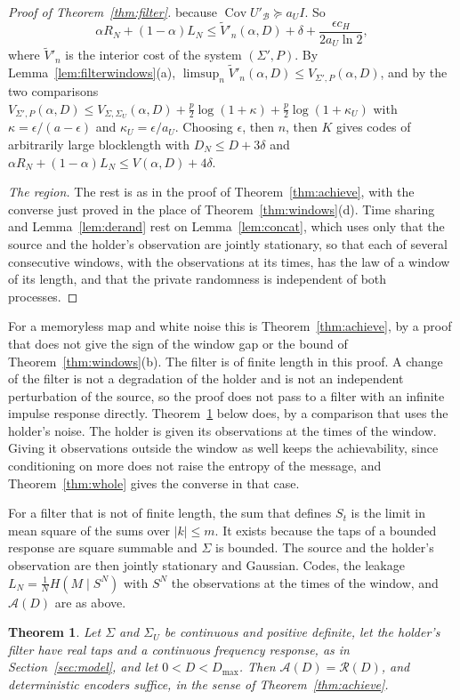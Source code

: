 \documentclass[11pt,onecolumn]{IEEEtran}
\newtheorem{theorem}{Theorem}
\newcommand{\Cov}{\operatorname{Cov}}
\begin{document}
\begin{proof}[Proof of Theorem~\ref{thm:filter}]
because $\Cov U'_{\mathcal B}\succeq a_UI$. So
\[
\alpha R_N+(1-\alpha)L_N\le\tilde V'_n(\alpha,D)+\delta+\frac{\epsilon c_H}{2a_U\ln2},
\]
where $\tilde V'_n$ is the interior cost of the system $(\Sigma',P)$. By
Lemma~\ref{lem:filterwindows}(a), $\limsup_n\tilde V'_n(\alpha,D)\le V_{\Sigma',P}(\alpha,D)$,
and by the two comparisons
$V_{\Sigma',P}(\alpha,D)\le V_{\Sigma,\Sigma_U}(\alpha,D)+\tfrac p2\log(1+\kappa)+\tfrac p2\log(1+\kappa_U)$
with $\kappa=\epsilon/(a-\epsilon)$ and $\kappa_U=\epsilon/a_U$. Choosing
$\epsilon$, then $n$, then $K$ gives codes of arbitrarily large
blocklength with $D_N\le D+3\delta$ and
$\alpha R_N+(1-\alpha)L_N\le V(\alpha,D)+4\delta$.

\emph{The region.} The rest is as in the proof of
Theorem~\ref{thm:achieve}, with the converse just proved in the place
of Theorem~\ref{thm:windows}(d). Time sharing and
Lemma~\ref{lem:derand} rest on Lemma~\ref{lem:concat}, which uses only
that the source and the holder's observation are jointly stationary,
so that each of several consecutive windows, with the observations at
its times, has the law of a window of its length, and that the private
randomness is independent of both processes.
\end{proof}

For a memoryless map and white noise this is Theorem~\ref{thm:achieve},
by a proof that does not give the sign of the window gap or the bound
of Theorem~\ref{thm:windows}(b). The filter is of finite length in this
proof. A change of the filter is not a degradation of the holder and is
not an independent perturbation of the source, so the proof does not
pass to a filter with an infinite impulse response directly.
Theorem~\ref{thm:iir} below does, by a comparison that uses the
holder's noise. The holder is given its observations
at the times of the window. Giving it observations outside the window
as well keeps the achievability, since conditioning on more does not
raise the entropy of the message, and Theorem~\ref{thm:whole} gives the
converse in that case.

For a filter that is not of finite length, the sum that defines $S_t$
is the limit in mean square of the sums over $|k|\le m$. It exists
because the taps of a bounded response are square summable and
$\Sigma$ is bounded. The source and the holder's observation are then
jointly stationary and Gaussian. Codes, the leakage
$L_N=\tfrac1NH(M\mid S^N)$ with $S^N$ the observations at the times of
the window, and $\mathcal A(D)$ are as above.

\begin{theorem}\label{thm:iir}
Let $\Sigma$ and $\Sigma_U$ be continuous and positive definite, let the
holder's filter have real taps and a continuous frequency response, as
in Section~\ref{sec:model}, and let
$0<D<D_{\max}$. Then $\mathcal A(D)=\mathcal R(D)$, and deterministic
encoders suffice, in the sense of Theorem~\ref{thm:achieve}.
\end{theorem}
\end{document}
